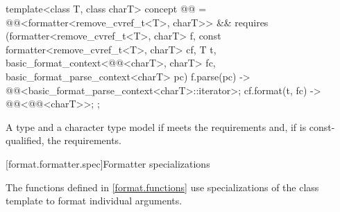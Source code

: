 \begin{codeblock}
template<class T, class charT>
  concept @@ =
    @@<formatter<remove_cvref_t<T>, charT>> &&
    requires (formatter<remove_cvref_t<T>, charT> f,
              const formatter<remove_cvref_t<T>, charT> cf,
              T t,
              basic_format_context<@@<charT>, charT> fc,
              basic_format_parse_context<charT> pc) {
        { f.parse(pc) } -> @@<basic_format_parse_context<charT>::iterator>;
        { cf.format(t, fc) } -> @@<@@<charT>>;
    };
\end{codeblock}

\pnum
A type  and a character type 
model 
if  meets
the  requirements
and, if  is const-qualified,
the  requirements.

[format.formatter.spec]{Formatter specializations}
%

\pnum
The functions defined in \ref{format.functions} use
specializations of the class template  to format
individual arguments.

